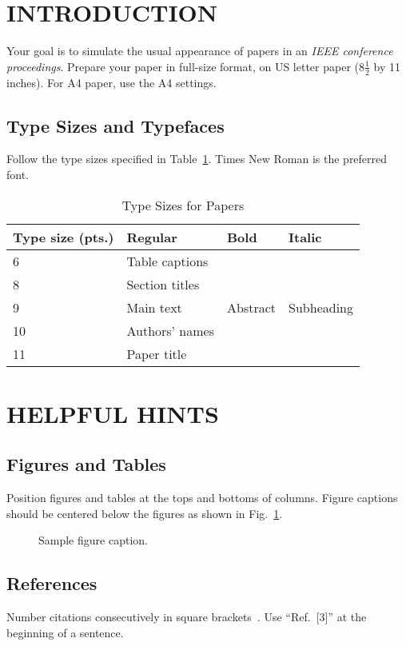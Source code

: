 \documentclass[conference]{IEEEtran}
\begin{document}
\section{INTRODUCTION}
Your goal is to simulate the usual appearance of papers in an \textit{IEEE conference proceedings}. Prepare your paper in full-size format, on US letter paper (8$\frac{1}{2}$ by 11 inches). For A4 paper, use the A4 settings.

\subsection{Type Sizes and Typefaces}
Follow the type sizes specified in Table~\ref{tab:type}. Times New Roman is the preferred font.

\begin{table}[ht]
\centering
\caption{Type Sizes for Papers}
\label{tab:type}
\begin{tabular}{|l|l|l|l|}
\hline
\textbf{Type size (pts.)} & \textbf{Regular} & \textbf{Bold} & \textbf{Italic} \\ \hline
6 & Table captions & & \\ \hline
8 & Section titles & & \\ \hline
9 & Main text & Abstract & Subheading \\ \hline
10 & Authors' names & & \\ \hline
11 & Paper title & & \\ \hline
\end{tabular}
\end{table}

\section{HELPFUL HINTS}
\subsection{Figures and Tables}
Position figures and tables at the tops and bottoms of columns. Figure captions should be centered below the figures as shown in Fig.~\ref{fig:sample}.

\begin{figure}[ht]
\centering
\caption{Sample figure caption.}
\label{fig:sample}
\end{figure}

\subsection{References}
Number citations consecutively in square brackets~\cite{ref1}. Use ``Ref.~[3]'' at the beginning of a sentence. 
\end{document}
